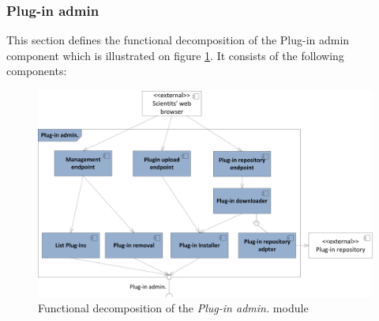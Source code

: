 \subsubsection{Plug-in admin}

This section defines the functional decomposition of the Plug-in admin component which is illustrated on figure \ref{fig_admin_func}. It consists of the following components:

\begin{figure}[h!]
  \centering
  	\includegraphics[scale=0.75]{plug-in/layers/admin-func.png}
  \caption{Functional decomposition of the \textit{Plug-in admin.} module}
  \label{fig_admin_func}
\end{figure}

